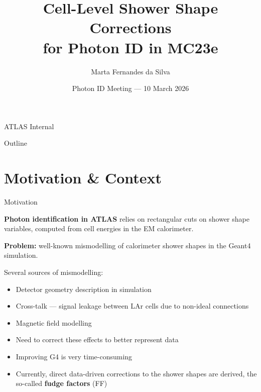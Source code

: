 \documentclass[aspectratio=169,10pt]{beamer}
\title[Cell-Level Shower Shape Corrections]{%
  Cell-Level Shower Shape Corrections\\[2pt]
  for Photon ID in MC23e}
\author[M.~Fernandes da Silva]{Marta Fernandes da Silva}
\institute{LIP / ATLAS}
\date{Photon ID Meeting — 10 March 2026}
\begin{document}

{
\begin{frame}
  \titlepage
  \vfill
  \centering
  {\small\color{gray} ATLAS Internal}
\end{frame}
}

\begin{frame}{Outline}
  \tableofcontents
\end{frame}

\section{Motivation \& Context}

\begin{frame}{Motivation}

  \textbf{Photon identification in ATLAS} relies on rectangular cuts
  on shower shape variables, computed from cell energies in the
  EM calorimeter.
  \vspace{8pt}

  \textbf{Problem:} well-known mismodelling of calorimeter shower
  shapes in the Geant4 simulation.
  \vspace{4pt}

  Several sources of mismodelling:
  \begin{itemize}
    \item Detector geometry description in simulation
    \item Cross-talk — signal leakage between LAr cells
          due to non-ideal connections
    \item Magnetic field modelling
  \end{itemize}
  \vspace{6pt}

  \begin{itemize}
    \item Need to correct these effects to better represent data
    \item Improving G4 is very time-consuming
    \item Currently, direct data-driven corrections to the shower
          shapes are derived, the so-called \textbf{fudge factors} (FF)
  \end{itemize}

\end{frame}
\end{document}

